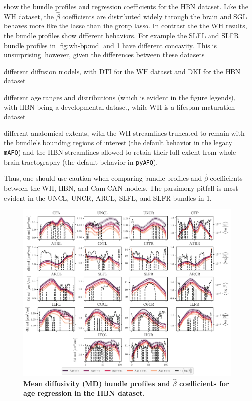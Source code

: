\documentclass[10pt,%
               aps,%
               prl,%
               reprint,%
               superscriptaddress,%
               preprintnumbers,%
               linenumbers,%
               amsmath,%
               floatfix]{revtex4-2}
\begin{document}
 show the bundle profiles and regression
coefficients for the HBN dataset. Like the WH dataset, the $\hat{\beta}$
coefficients are distributed widely through the brain and SGL behaves more
like the lasso than the group lasso. In contrast the the WH results,
the bundle profiles show different behaviors. For example the SLFL and SLFR
bundle profiles in \cref{fig:wh-bp:md} and \cref{fig:hbn-bp:md} have
different concavity. This is unsurprising, however, given the differences
between these datasets
\begin{enumerate*}[%
    label=(\roman*),%
    before=\unskip{: },%
    itemjoin={{, }},%
    itemjoin*={{, and }}]
    \item different diffusion models, with DTI for the WH dataset and DKI for
    the HBN dataset
    \item different age ranges and distributions (which is evident in the
    figure legends), with HBN being a developmental dataset, while WH is a
    lifespan maturation dataset
    \item different anatomical extents, with the WH streamlines truncated to
    remain with the bundle's bounding regions of interest (the default
    behavior in the legacy \texttt{mAFQ}) and the HBN streamlines allowed
    to retain their full extent from whole-brain tractography (the default
    behavior in \texttt{pyAFQ}).
\end{enumerate*}
Thus, one should use caution when comparing bundle profiles and $\hat{\beta}$
coefficients between the WH, HBN, and Cam-CAN models.
The parsimony pitfall is most evident in the UNCL, UNCR, ARCL, SLFL, and
SLFR bundles in \cref{fig:hbn-bp:md}.

\begin{figure}
    \includegraphics[width=\textwidth]{hbn_coefs_profiles_md.pdf}
    \caption{%
        {%
            \bf Mean diffusivity (MD) bundle profiles and $\hat{\beta}$
            coefficients for age regression in the HBN dataset.
        }
        \label{fig:hbn-bp:md}
    }
\end{figure}
\end{document}
